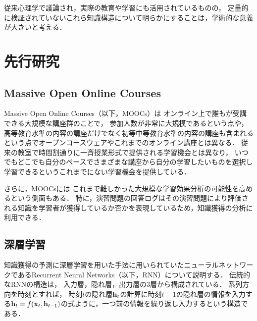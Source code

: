 \documentclass[twocolumn,a4j,10pt]{jsarticle}
\begin{document}
従来心理学で議論され，実際の教育や学習にも活用されているものの，
定量的に検証されていないこれら知識構造について明らかにすることは，学術的な意義が大きいと考える．

\section{先行研究}
\subsection{Massive Open Online Courses}
Massive Open Online Courses（以下，MOOCs）は
オンライン上で誰もが受講できる大規模な講座群のことで，
参加人数が非常に大規模であるという点や，高等教育水準の内容の講座だけでなく初等中等教育水準の内容の講座も含まれるという点でオープンコースウェアやこれまでのオンライン講座とは異なる．
従来の教室で時間割通りに一斉授業形式で提供される学習機会とは異なり，
いつでもどこでも自分のペースでさまざまな講座から自分の学習したいものを選択し学習できるというこれまでにない学習機会を提供している．

さらに，MOOCsには
これまで難しかった大規模な学習効果分析の可能性を高めるという側面もある．
特に，演習問題の回答ログはその演習問題により評価される知識を学習者が獲得しているか否かを表現しているため，知識獲得の分析に利用できる．

\subsection{深層学習}

知識獲得の予測に深層学習を用いた手法\cite{piech2015deep}に用いられていたニューラルネットワークであるRecurrent Neural Networks（以下，RNN）について説明する．
伝統的なRNNの構造は，
入力層，隠れ層，出力層の3層から構成されている．
系列方向を時刻とすれば，
時刻$t$の隠れ層${\bf h}_t$の計算に時刻$t-1$の隠れ層の情報を入力する${\bf h}_t = f({\bf x}_t, {\bf h}_{t-1})$の式ように，一つ前の情報を繰り返し入力するという構造である．
\end{document}
